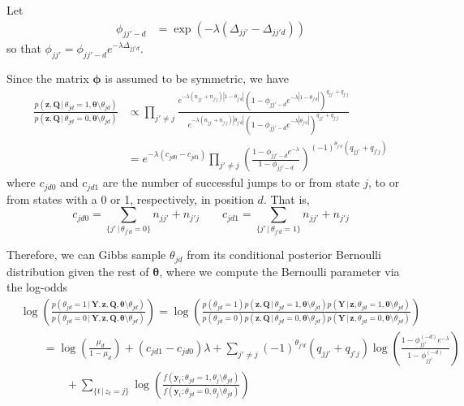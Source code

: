 \documentclass[12pt,letterpaper]{report}
\newcommand{\given}{\, \vert \,}
\newcommand{\abs}[1]{\left\vert #1 \right\vert}
\newcommand{\by}{\mathbf{y}}
\newcommand{\bY}{\mathbf{Y}}
\newcommand{\bQ}{\mathbf{Q}}
\newcommand{\bz}{\mathbf{z}}
\newcommand{\btheta}{\boldsymbol{\theta}}
\newcommand{\bphi}{\boldsymbol{\phi}}
\begin{document}
Let
\begin{align}
  \label{eq:68}
  \phi_{jj'-d} &= \exp(-\lambda(\Delta_{jj'} - \Delta_{jj'd}))
\end{align}
so that $\phi_{jj'} = \phi_{jj'-d} e^{-\lambda\Delta_{jj'd}}$.

Since the matrix $\bphi$ is assumed to be symmetric, we have
\begin{align}
  \label{eq:70}
  \frac{p(\bz, \bQ \given \theta_{jd}  = 1, \btheta\setminus\theta_{jd}
    )}{p(\bz, \bQ \given \theta_{jd}  = 0, \btheta\setminus\theta_{jd} )}
  &\propto \prod_{j' \neq j}
  \frac{e^{-\lambda(n_{jj'} + n_{j'j})\abs{1 - \theta_{j'd}}}(1 -
    \phi_{jj'-d} e^{-\lambda\abs{1 - \theta_{j'd}}})^{q_{jj'} +
      q_{j'j}}}{e^{-\lambda(n_{jj'} + n_{j'j})\abs{\theta_{j'd}}}
    (1-\phi_{jj'-d}e^{-\lambda\abs{\theta_{j'd}}})^{q_{jj'} +
      q_{j'j}}} \\
  &= \label{eq:71} e^{-\lambda(c_{jd0} - c_{jd1})}
  \prod_{j' \neq j} \left(\frac{1 - \phi_{jj'-d}e^{-\lambda}}{1-\phi_{jj'-d}}\right)^{(-1)^{\theta_{j'd}}(q_{jj'} + q_{j'j})}
\end{align}
where $c_{jd0}$ and $c_{jd1}$ are the number of successful jumps to or
from state $j$, to or from states with a 0 or 1, respectively, in
position $d$.  That is,
\begin{equation}
  \label{eq:72}
  c_{jd0} = \sum_{\{j' \given \theta_{j'd} = 0\}} n_{jj'} + n_{j'j}\qquad c_{jd1} = \sum_{\{j' \given \theta_{j'd} = 1\}} n_{jj'} + n_{j'j}
\end{equation}

Therefore, we can Gibbs sample $\theta_{jd}$ from its conditional
posterior Bernoulli distribution given the rest of $\btheta$, where
we compute the Bernoulli parameter via the log-odds
\begin{align}
  \label{eq:77}
  &\log\left(\frac{p(\theta_{jd} = 1 \given \bY, \bz, \bQ, \btheta \setminus
    \theta_{jd})}{p(\theta_{jd} = 0 \given \bY, \bz, \bQ, \btheta
    \setminus \theta_{jd})}\right) = \log\left(\frac{p(\theta_{jd} =
  1) p(\bz, \bQ \given \theta_{jd} = 1, \btheta \setminus
  \theta_{jd}) p(\bY \given \bz, \theta_{jd} = 1, \btheta \setminus \theta_{jd})}{p(\theta_{jd} = 0) p(\bz, \bQ \given \theta_{jd} = 0,
  \btheta \setminus \theta_{jd}) p(\bY \given \bz, \theta_{jd} = 0,
  \btheta \setminus \theta_{jd})}\right) \\ & \qquad = \log\left(\frac{\mu_d}{1 - \mu_d}\right)
  + (c_{jd1} - c_{jd0}) \lambda +
    \sum_{j' \neq j}
  (-1)^{\theta_{j'd}}(q_{jj'} + q_{j'j})\log\left(\frac{1 -
      \phi_{jj'}^{(-d)}e^{-\lambda}}{1-\phi_{jj'}^{(-d)}}\right) \\ &
  \qquad \qquad + \sum_{\{t \given z_t = j\}} \log\left(\frac{f(\by_t;
      \theta_{jd} = 1, \theta_j \setminus \theta_{jd})}{f(\by_t;
      \theta_{jd} = 0, \theta_j \setminus \theta_{jd})}\right)
\end{align}
\end{document}
